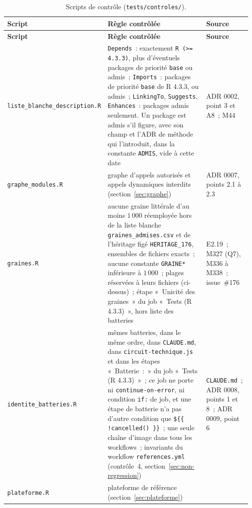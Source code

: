 \documentclass[a4paper,11pt]{article}
\newcommand{\code}[1]{\texttt{\small #1}}
\begin{document}
\begin{center}
\small
{}
\begin{longtable}{@{}p{4.6cm}p{7.4cm}p{2.8cm}@{}}
\caption{Scripts de contrôle (\code{tests/controles/}).}
\label{tab:scripts-controle}\\
\rowcolor{tableheader}
\textcolor{financeblue}{\textbf{Script}} &
\textcolor{financeblue}{\textbf{Règle contrôlée}} &
\textcolor{financeblue}{\textbf{Source}} \\
\endfirsthead
\rowcolor{tableheader}
\textcolor{financeblue}{\textbf{Script}} &
\textcolor{financeblue}{\textbf{Règle contrôlée}} &
\textcolor{financeblue}{\textbf{Source}} \\
\endhead
\code{liste\_blanche\_}\newline\code{description.R} & \code{Depends}~: exactement
\code{R (>= 4.3.3)}, plus d'éventuels packages de priorité \code{base} ou
admis~; \code{Imports}~: packages de priorité \code{base} de R 4.3.3, ou
admis~; \code{LinkingTo}, \code{Suggests}, \code{Enhances}~: packages admis
seulement. Un package est admis s'il figure, avec son champ et l'ADR de
méthode qui l'introduit, dans la constante \code{ADMIS}, vide à cette date &
ADR 0002, point 3 et A8~; M44 \\
\code{graphe\_modules.R} & graphe d'appels autorisés et appels dynamiques
interdits (section~\ref{sec:graphe}) & ADR 0007, points 2.1 à 2.3 \\
\code{graines.R} & aucune graine littérale d'au moins $1\,000$ réemployée
hors de la liste blanche \code{graines\_admises.csv} et de l'héritage figé
\code{HERITAGE\_176}, ensembles de fichiers exacts~; aucune constante
\code{GRAINE*} inférieure à $1\,000$~; plages réservées à leurs fichiers
(ci-dessus)~; étape «~Unicité des graines~» du job «~Tests (R 4.3.3)~», hors
liste des batteries & E2.19~; M327 (Q7), M336 à M338~; issue~\#176 \\
\code{identite\_batteries.R} & mêmes batteries, dans le même ordre, dans
\code{CLAUDE.md}, dans \code{circuit-technique.js} et dans les étapes
«~Batterie~:~» du job «~Tests (R 4.3.3)~»~; ce job ne porte ni
\code{continue-on-error}, ni condition \code{if:} de job, et une étape de
batterie n'a pas d'autre condition que \code{\$\{\{ !cancelled() \}\}}~; une
seule chaîne d'image dans tous les workflows~; invariants du workflow
\code{references.yml} (contrôle~4, section~\ref{sec:non-regression}) &
\code{CLAUDE.md}~; ADR 0008, points 1 et 8~; ADR 0009, point 6 \\
\code{plateforme.R} & plateforme de référence (section~\ref{sec:plateforme}) &

\end{longtable}
\end{center}
\end{document}
